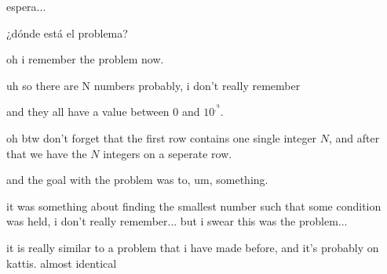 \noindent
espera...

¿dónde está el problema?


\newpage
\vspace{90 cm}

oh i remember the problem now.



uh so there are N numbers probably, i don't really remember

and they all have a value between 0 and $10^{.^9}$.

oh btw don't forget that the first row contains one single integer $N$, and after that we have the $N$ integers on a seperate row.


and the goal with the problem was to, um, something. 


it was something about finding the smallest number such that some condition was held, i don't really remember... but i swear this was the problem...


\newpage
\vspace{90 cm}
it is really similar to a problem that i have made before, and it's probably on kattis. almost identical


